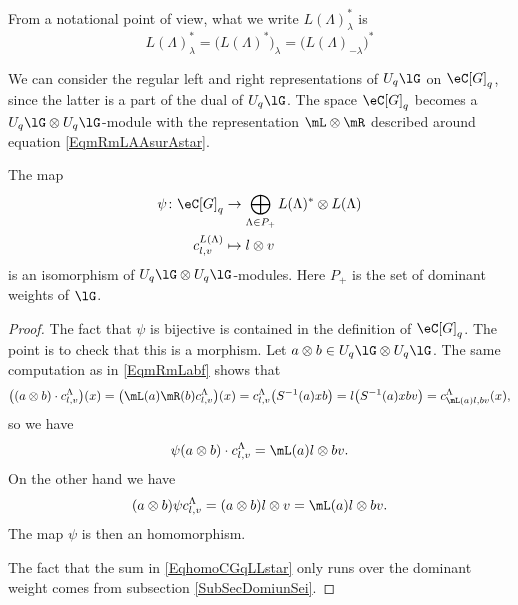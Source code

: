 From a notational point of view, what we write \( L(\Lambda)^*_{\lambda}\) is
\begin{equation}
    L(\Lambda)^*_{\lambda}=\big( L(\Lambda)^* \big)_{\lambda}=\big( L(\Lambda)_{-\lambda} \big)^*   
\end{equation}

We can consider the regular left and right representations of \( U_q\lG\) on \( \eC[G]_q\), since the latter is a part of the dual of \( U_q\lG\). The space \( \eC[G]_q\) becomes a \( U_q\lG\otimes U_q\lG\)-module with the representation \( \mL\otimes \mR\) described around equation \eqref{EqmRmLAAsurAstar}.
\begin{proposition}
    The map
    \begin{equation}        \label{EqhomoCGqLLstar}
        \begin{aligned}
            \psi\colon \eC[G]_q&\to \bigoplus_{\Lambda\in P_+}L(\Lambda)^*\otimes L(\Lambda) \\
            c^{L(\Lambda)}_{l,v}&\mapsto l\otimes v 
        \end{aligned}
    \end{equation}
    is an isomorphism of \( U_q\lG\otimes U_q\lG\)-modules. Here \( P_+\) is the set of dominant weights of \( \lG\). 
\end{proposition}

\begin{proof}
    The fact that \( \psi\) is bijective is contained in the definition of \( \eC[G]_q\). The point is to check that this is a morphism. Let \( a\otimes b\in U_q\lG\otimes U_q\lG\). The same computation as in \eqref{EqmRmLabf} shows that
    \begin{equation}
        \big( (a\otimes b)\cdot c^{\Lambda}_{l,v} \big)(x)=\big( \mL(a)\mR(b)c_{l,v}^{\Lambda} \big)(x)=c^{\Lambda}_{l,v}\big( S^{-1}(a)xb \big)=l\big( S^{-1}(a)xbv \big)=c^{\Lambda}_{\mL(a)l,bv}(x),
    \end{equation}
    so we have
    \begin{equation}
        \psi(a\otimes b)\cdot c_{l,v}^{\Lambda}=\mL(a)l\otimes bv.
    \end{equation}
    On the other hand we have
    \begin{equation}
        (a\otimes b)\psi c_{l,v}^{\Lambda}=(a\otimes b)l\otimes v=\mL(a)l\otimes bv.
    \end{equation}
    The map \( \psi\) is then an homomorphism.

    The fact that the sum in \eqref{EqhomoCGqLLstar} only runs over the dominant weight comes from subsection \ref{SubSecDomiunSei}.
\end{proof}

